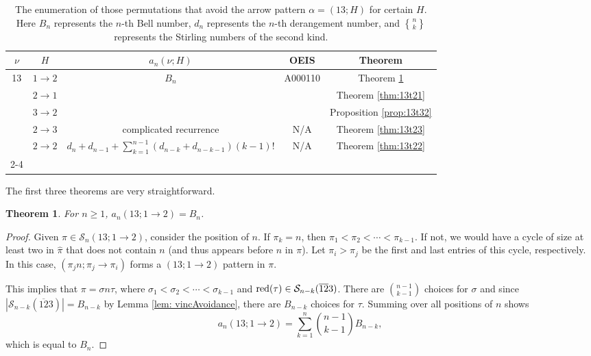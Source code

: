 \documentclass[11pt]{article}
\newcommand{\ol}[1]{\overline{#1}}
\renewcommand\S{\mathcal S}
\newtheorem{theorem}{Theorem}[section]
\theoremstyle{definition}
\newcommand{\stirling}[2]{\genfrac{\{}{\}}{0pt}{}{#1}{#2}}
\begin{document}
\begin{table}[H]
    \centering
    \begin{tabular}{|c|c|c|c|c|} 
    \hline
         $\nu$ & $H$ & $a_n(\nu;H)$  & OEIS & Theorem \\ \hline\hline
        \multirow{5}{*}{13}  & $1\to2$ 
        &  \multirow{3}{*}{$B_n$} & \multirow{3}{*}{A000110}& Theorem \ref{thm:13t12} \\ \cline{2-2} \cline{5-5}
           & $2\to1$ 
        & && Theorem \ref{thm:13t21} \\ \cline{2-2} \cline{5-5}
        & $3\to2$ 
        && & Proposition \ref{prop:13t32} \\ \cline{2-5}
           & $2\to3$ 
        & complicated recurrence & N/A & Theorem \ref{thm:13t23} \\ \cline{2-5}   
           & $2\to2$
        &  $d_n + d_{n-1} + \sum_{k=1}^{n-1} (d_{n-k} + d_{n-k-1})(k-1)!$& N/A & Theorem \ref{thm:13t22} \\ \cline{2-4} \hline
    \end{tabular}
    \caption{The enumeration of those permutations that avoid the arrow pattern $\alpha=(13;H)$ for certain $H$. Here $B_n$ represents the $n$-th Bell number, $d_n$ represents the $n$-th derangement number, and $\stirling{n}{k}$ represents the Stirling numbers of the second kind.}
    \label{tab:13}
\end{table}


The first three theorems are very straightforward.

\begin{theorem} \label{thm:13t12}
    For $n \geq 1$, $a_n(13; 1 \to 2) = B_n$.
\end{theorem}

\begin{proof}
    Given $\pi \in \S_n(13; 1 \to 2)$, consider the position of $n$. If $\pi_k = n$, then $\pi_1<\pi_2 < \cdots < \pi_{k-1}$. If not, we would have a cycle of size at least two in $\hat\pi$ that does not contain $n$ (and thus appears before $n$ in $\pi$). Let $\pi_i > \pi_j$ be the first and last entries of this cycle, respectively. In this case, $(\pi_j n ; \pi_j \to \pi_i)$ forms a $(13; 1 \to 2)$ pattern in $\pi$. 

    This implies that $\pi = \sigma n \tau$, where $\sigma_1 < \sigma_2 < \cdots < \sigma_{k-1}$ and ${\rm red}(\tau) \in \S_{n-k}(\ol{12}3)$. There are $\binom{n-1}{k-1}$ choices for $\sigma$ and since $|\S_{n-k}(\ol{12}3)| = B_{n-k}$ by Lemma \ref{lem: vincAvoidance}, there are $B_{n-k}$ choices for $\tau$. Summing over all positions of $n$ shows
    \[
    a_n(13; 1 \to 2) = \sum_{k=1}^n \binom{n-1}{k-1} B_{n-k},
    \] which is equal to $B_n.$
\end{proof}
\end{document}
